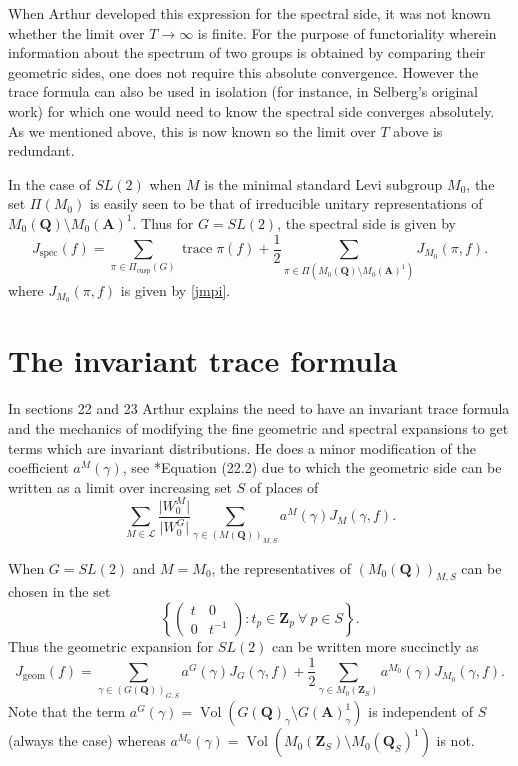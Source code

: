\documentclass[11pt]{amsart}
\def\A{\mathbf A}
\def\Q{\mathbf Q}
\def\Z{\mathbf Z}
\def\LLL{\mathcal L}
\def\bs{\setminus}
\def\mod#1{\lvert #1 \rvert} %
\def\trace{\operatorname{trace}}
\def\vol{\operatorname{Vol}}
\theoremstyle{remark}
\begin{document}
When Arthur developed this expression for the spectral side, it was not known whether the limit over $T \to \infty$ is finite. For the purpose of functoriality wherein information about the spectrum of two groups is obtained by comparing their geometric sides, one does not require this absolute convergence. However the trace formula can also be used in isolation (for instance, in Selberg's original work) for which one would need to know the spectral side converges absolutely. As we mentioned above, this is now known \cite{FLM} so the limit over $T$ above is redundant. 

In the case of $SL(2)$ when $M$ is the minimal standard Levi subgroup $M_0$, the set $\Pi(M_0)$ is easily seen to be that of irreducible unitary representations of $M_0(\Q)\bs M_0(\A)^1$. Thus for $G = SL(2)$, the spectral side is given by
\begin{equation} \label{spec}
	J_{\text{spec}}(f) = \sum_{\pi \in \Pi_{\text{cusp}}(G)} \trace \pi(f) + \frac{1}{2}
		\sum_{\pi \in \Pi(M_0(\Q)\bs M_0(\A)^1)} J_{M_0}(\pi, f). 
\end{equation}
where $J_{M_0}(\pi, f)$ is given by \cref{jmpi}. 

\section{The invariant trace formula}

In sections 22 and 23 Arthur explains the need to have an invariant trace formula and the mechanics of modifying the fine geometric and spectral expansions to get terms which are invariant distributions. He does a minor modification of the coefficient $a^M(\gamma)$, see \cite{clay}*{Equation (22.2)} due to which the geometric side can be written as a limit over increasing set $S$ of places of
\[ \sum_{M \in \LLL} \frac{\mod{W_0^M}}{\mod{W_0^G}} \sum_{\gamma \in (M(\Q))_{M, S}} a^M(\gamma) J_M(\gamma, f). \]

When $G=SL(2)$ and $M=M_0$, the representatives of $(M_0(\Q))_{M, S}$ can be chosen in the set 
\[ \left \{ \begin{pmatrix} t & 0 \\ 0 & t^{-1} \end{pmatrix} : t_p \in \Z_p \ \forall \ p \in S \right \}. \]
Thus the geometric expansion for $SL(2)$ can be written more succinctly as  
\[ J_{\text{geom}}(f) = \sum_{\gamma \in (G(\Q))_{G, S}} a^G(\gamma) J_G(\gamma, f) + 
		\frac{1}{2} \sum_{\gamma \in M_0(\Z_S)} a^{M_0}(\gamma) J_{M_0}(\gamma, f). \]
Note that the term $a^G(\gamma) = \vol(G(\Q)_\gamma \bs G(\A)^1_\gamma)$ is independent of $S$ (always the case) whereas $a^{M_0}(\gamma) = \vol (M_0(\Z_S)\bs M_0(\Q_S)^1)$ is not. 
\end{document}
